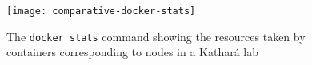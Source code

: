 \begin{figure}
  \centering
  \texttt{[image: comparative-docker-stats]}
  \caption{The \texttt{docker stats} command showing the resources taken by containers corresponding to nodes in a Kathará lab}
  \label{fig:comparative-docker-stats}
\end{figure}
